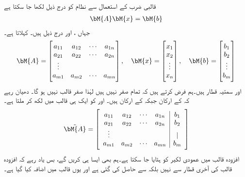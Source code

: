 قالبی ضرب کے استعمال سے نظام  کو درج ذیل لکھا جا سکتا ہے
\begin{align}
\bM{A}\bM{x}=\bM{b}
\end{align}
جہاں ،  اور  درج ذیل ہیں۔  کہلاتا ہے۔
\begin{align}
\bM{A}=\begin{bmatrix} a_{11}&a_{12}&\cdots &a_{1n}\\a_{21}&a_{22}&\cdots&a_{2n}\\\vdots\\a_{m1}&a_{m2}&\cdots&a_{mn} \end{bmatrix}, \quad \bM{x}=\begin{bmatrix}x_1\\x_2\\ \vdots \\x_n  \end{bmatrix}, \quad \bM{b}=\begin{bmatrix} b_1\\b_2\\ \vdots\\ b_m \end{bmatrix}
\end{align}
 اور  سمتیہ قطار ہیں۔ہم فرض کرتے ہیں کہ  تمام صفر نہیں ہیں لہٰذا  صفر قالب نہیں ہو گا۔  دھیان رہے کہ  کے  ارکان جبکہ  کے  ارکان ہیں۔ اور  کو ایک ہی قالب میں لکھ کر    ملتا ہے۔
\begin{align}
\tilde{\bM{A}}=\left[\begin{array}{cccc|c} a_{11}&a_{12}&\cdots &a_{1n}&b_1\\a_{21}&a_{22}&\cdots&a_{2n}&b_2\\ \vdots &&&&|\\a_{m1}&a_{m2}&\cdots&a_{mn}&b_m \end{array}\right]
\end{align}
افزودہ قالب میں عمودی لکیر کو ہٹایا جا سکتا ہے۔ہم بھی ایسا ہی کریں گے، بس یاد رہے کہ افزودہ قالب کی آخری قطار  سے نہیں بلکہ  سے حاصل کی گئی ہے اور یوں  قالب میں اضافہ کیا گیا ہے۔

